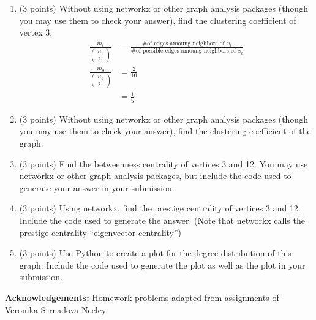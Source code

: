 \documentclass[11pt]{article}
\begin{document}
\begin{enumerate}
    \item (3 points) Without using networkx or other graph analysis packages
    (though you may use them to check your answer), find the clustering
    coefficient of vertex 3.
    \begin{align*}
        \frac{ m_{i} }{ ( \substack{ n_{i} \\ 2} ) } &= \frac{ \text{\# of edges amoung neighbors of } x_{i} }{ \text{\# of possible edges amoung neighbors of } x_{i} } \\
        \frac{ m_{3} }{ ( \substack{ n_{3} \\ 2} ) } &= \frac{2}{10} \\
        &= \frac{1}{5}
    \end{align*}

    \item (3 points) Without using networkx or other graph analysis packages
    (though you may use them to check your answer), find the clustering
    coefficient of the graph.

    \item (3 points) Find the betweenness centrality of vertices 3 and 12. You
    may use networkx or other graph analysis packages, but include the code used
    to generate your answer in your submission.

    \item (3 points) Using networkx, find the prestige centrality of vertices 3
    and 12. Include the code used to generate the answer. (Note that networkx
    calls the prestige centrality ``eigenvector centrality'')

    \item (3 points) Use Python to create a plot for the degree distribution of
    this graph.  Include the code used to generate the plot as well as the plot
    in your submission.

\end{enumerate}

{\bf Acknowledgements:} Homework problems adapted from assignments of
Veronika Strnadova-Neeley.
\end{document}
